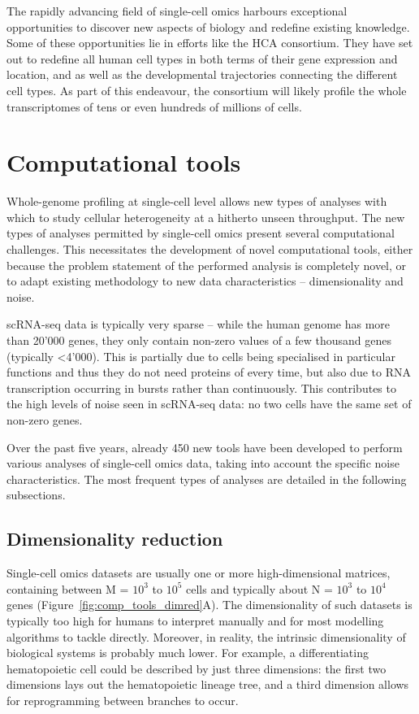 The rapidly advancing field of single-cell omics harbours exceptional opportunities to discover new aspects of biology and redefine existing knowledge. Some of these opportunities lie in efforts like the HCA consortium\cite{regev_humancellatlas_2018}. They have set out to redefine all human cell types in both terms of their gene expression and location, and as well as the developmental trajectories connecting the different cell types. As part of this endeavour, the consortium will likely profile the whole transcriptomes of tens or even hundreds of millions of cells\cite{humancellatlasconsortium_humancellatlas_2018}. 

\section{Computational tools}
Whole-genome profiling at single-cell level allows new types of analyses with which to study cellular heterogeneity at a hitherto unseen throughput. 
The new types of analyses permitted by single-cell omics present several computational challenges\cite{stegle_computationalanalyticalchallenges_2015, yuan_challengesemergingdirections_2017, chen_singlecellrnaseqtechnologies_2019}. This necessitates the development of novel computational tools, either because the problem statement of the performed analysis is completely novel, or to adapt existing methodology to new data characteristics -- dimensionality and noise. 

scRNA-seq data is typically very sparse -- while the human genome has more than 20'000 genes, they only contain non-zero values of a few thousand genes (typically <4'000). This is partially due to cells being specialised in particular functions and thus they do not need proteins of every time, but also due to RNA transcription occurring in bursts rather than continuously\cite{nicolas_whatshapeseukaryotic_2017}. This contributes to the high levels of noise seen in scRNA-seq data: no two cells have the same set of non-zero genes. 

Over the past five years, already 450 new tools have been developed to perform various analyses of single-cell omics data\cite{zappia_exploringsinglecellrnaseq_2018}, taking into account the specific noise characteristics. The most frequent types of analyses are detailed in the following subsections.

\subsection{Dimensionality reduction}
Single-cell omics datasets are usually one or more high-dimensional matrices, containing between M = $10^3$ to $10^5$ cells and typically about N = $10^3$ to $10^4$ genes (Figure~\ref{fig:comp_tools_dimred}A). The dimensionality of such datasets is typically too high for humans to interpret manually and for most modelling algorithms to tackle directly. 
Moreover, in reality, the intrinsic dimensionality of biological systems is probably much lower. For example, a differentiating hematopoietic cell could be described by just three dimensions: the first two dimensions lays out the hematopoietic lineage tree, and a third dimension allows for reprogramming between branches to occur.

